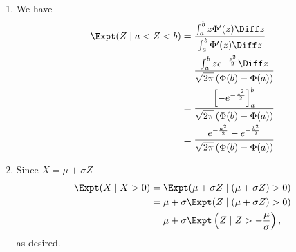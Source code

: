 \Question{\currfilebase}
\begin{enumerate}
    \item We have
          \begin{align*}
              \Expt(Z \mid a < Z < b) & = \frac{\int_{a}^{b} z \Phi'(z) \Diff z}{\int_{a}^{b} \Phi'(z) \Diff z}                       \\
                                      & = \frac{\int_{a}^{b} z e^{-\frac{z^2}{2}}\Diff z}{\sqrt{2\pi} \left(\Phi(b) - \Phi(a)\right)} \\
                                      & = \frac{\left[-e^{-\frac{z^2}{2}}\right]_{a}^{b}}{\sqrt{2\pi} \left(\Phi(b) - \Phi(a)\right)} \\
                                      & = \frac{e^{-\frac{a^2}{2}} - e^{-\frac{b^2}{2}}}{\sqrt{2\pi} \left(\Phi(b) - \Phi(a)\right)}
          \end{align*}

    \item Since \(X = \mu + \sigma Z\)
          \begin{align*}
              \Expt(X \mid X > 0) & = \Expt(\mu + \sigma Z \mid (\mu + \sigma Z) > 0)                 \\
                                  & = \mu + \sigma \Expt(Z \mid (\mu + \sigma Z) > 0)                 \\
                                  & = \mu + \sigma \Expt\left(Z \mid Z > - \frac{\mu}{\sigma}\right),
          \end{align*}
          as desired.


\end{enumerate}
